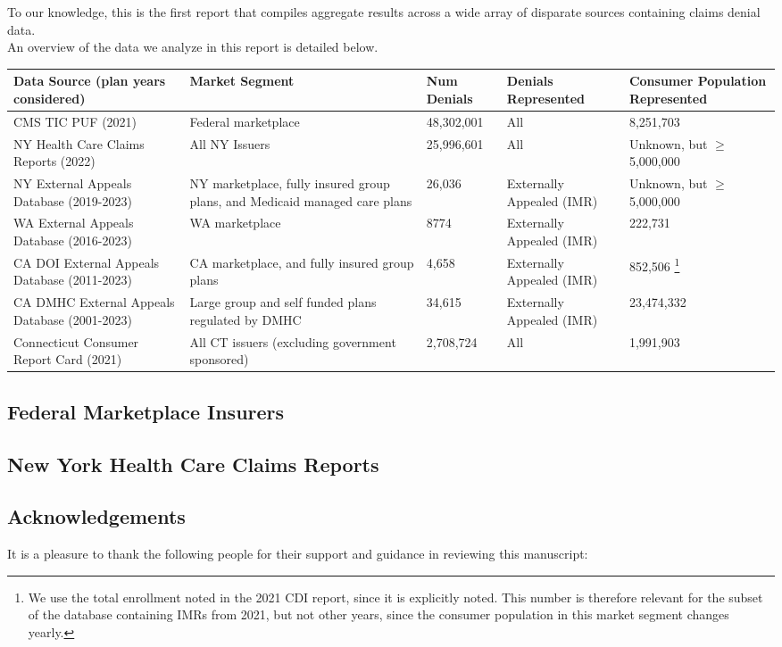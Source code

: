 \documentclass[psamsfonts]{amsart}
\theoremstyle{plain}
\theoremstyle{definition}
\theoremstyle{remark}
\begin{document}
To our knowledge, this is the first report that compiles aggregate results across a wide array of disparate sources containing claims denial data.\\

An overview of the data we analyze in this report is detailed below.\\

	\begin{table}[!h]
	\centering
	\begin{tabular}{|p{4cm}|p{4cm}|p{2cm}|p{2cm}|p{3cm}|}
		\hline
		Data Source (plan years considered) & Market Segment & Num Denials & Denials Represented & Consumer Population Represented  \\ \hline
		CMS TIC PUF (2021) & Federal marketplace & 48,302,001 & All & 8,251,703 \\ \hline
		NY Health Care Claims Reports (2022) & All NY Issuers & 25,996,601 & All & Unknown, but $\geq$ 5,000,000  \\ \hline
		NY External Appeals Database (2019-2023) & NY marketplace, fully insured group plans, and Medicaid managed care plans & 26,036 & Externally Appealed (IMR) & Unknown, but $\geq$ 5,000,000  \\ \hline
		WA External Appeals Database (2016-2023) & WA marketplace & 8774 & Externally Appealed (IMR) & 222,731  \\ \hline
		CA DOI External Appeals Database (2011-2023) & CA marketplace, and fully insured group plans & 4,658 & Externally Appealed (IMR) & 852,506 \footnote{We use the total enrollment noted in the 2021 CDI report, since it is explicitly noted. This number is therefore relevant for the subset of the database containing IMRs from 2021, but not other years, since the consumer population in this market segment changes yearly. }  \\ \hline
		CA DMHC External Appeals Database (2001-2023) & Large group and self funded plans regulated by DMHC & 34,615 & Externally Appealed (IMR) & 23,474,332  \\ \hline
		Connecticut Consumer Report Card (2021) & All CT issuers (excluding government sponsored) & 2,708,724 & All & 1,991,903  \\ \hline
	\end{tabular}
\end{table}
	

\subsection{Federal Marketplace Insurers}

\subsection{New York Health Care Claims Reports}



\subsection{Acknowledgements}
It is a pleasure to thank the following people for their support and guidance in reviewing this manuscript:






	
\end{document}
